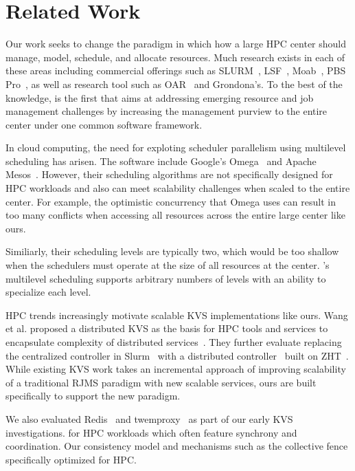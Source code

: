 \section{Related Work}
Our work seeks to change the paradigm in which 
how a large HPC center should manage, model, schedule, and
allocate resources. 
Much research exists in
each of these areas including commercial offerings
such as SLURM~\cite{Jette02slurm}, 
LSF~\cite{LSF}, Moab~\cite{MOAB}, PBS Pro~\cite{PSBPro},
as well as research tool such as OAR~\cite{Oar} and 
Grondona's. To the best of the knowledge, \flux 
is the first that aims at addressing emerging
resource and job management challenges
by increasing the management purview to the entire center
under one common software framework. 

In cloud computing, the need for exploting
scheduler parallelism using multilevel scheduling 
has arisen. The software include Google's 
Omega~\cite{Omega} and Apache Mesos~\cite{Mesos}. 
However, their scheduling algorithms are not specifically
designed for HPC workloads and also can meet 
scalability challenges when scaled to the entire center. 
For example, the optimistic concurrency that Omega uses 
can result in too many conflicts when accessing
all resources across the entire large center like ours.

Similiarly, their scheduling levels are typically 
two, which would be too shallow when the schedulers 
must operate at the size of all resources at the center. 
\flux's multilevel scheduling supports arbitrary 
numbers of levels with an ability to specialize each level.


HPC trends increasingly motivate scalable KVS implementations 
like ours. Wang et al. proposed a distributed KVS 
as the basis for HPC tools and services to encapsulate
complexity of distributed services~\cite{Wang:2013:USE:2503210.2503239}.
%
They further evaluate replacing the centralized controller in
Slurm~\cite{Jette02slurm} with a distributed controller~\cite{Slurmpp}
built on ZHT~\cite{Li:2013:ZLR:2510661.2511401}.
While existing KVS work takes an incremental approach of improving 
scalability of a traditional RJMS paradigm with new scalable services,
ours are built specifically to support the new paradigm. 

We also evaluated Redis~\cite{Redis} and twemproxy~\cite{Twemproxy}
as part of our early KVS investigations.
for HPC workloads which often feature synchrony and coordination. 
Our consistency model and mechanisms such as the collective fence 
specifically optimized for HPC.


